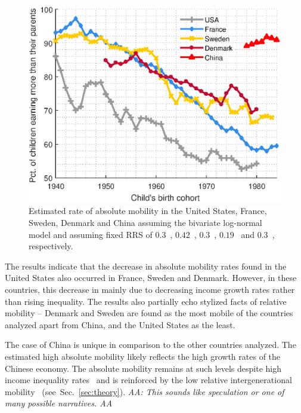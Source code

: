 \documentclass[12pt,a4paper]{article}
\newcommand{\red}[1]{{\color{red} #1}}
\newcommand{\sref}[1]{Sec.~\ref{sec:#1}}
\newcommand{\AAA}[1]{\red{{\it AA: #1 AA}}}
\newcommand{\flabel}[1]{\label{fig:#1}}
\numberwithin{equation}{section}
\begin{document}
\begin{figure}[!htb]
\centering
\includegraphics[width=1.0\textwidth] {./figs/countries2.eps}
\caption{Estimated rate of absolute mobility in the United States, France, Sweden, Denmark and China assuming the bivariate log-normal model and assuming fixed RRS of $0.3$~\citep{chetty2014land}, $0.42$~\citep{lefranc2005intergenerational}, $0.3$~\citep{bjorklund1997intergenerational}, $0.19$~\citep{landerso2016scandinavian} and $0.3$~\citep{fan2015great}, respectively.}
\flabel{countries}
\end{figure}

The results indicate that the decrease in absolute mobility rates found in the United States also occurred in France, Sweden and Denmark. However, in these countries, this decrease in mainly due to decreasing income growth rates rather than rising inequality. The results also partially echo stylized facts of relative mobility -- Denmark and Sweden are found as the most mobile of the countries analyzed apart from China, and the United States as the least.

The case of China is unique in comparison to the other countries analyzed. The estimated high absolute mobility likely reflects the high growth rates of the Chinese economy. The absolute mobility remains at such levels despite high income inequality rates~\citep{piketty2017capital} and is reinforced by the low relative intergenerational mobility~\citep{corak2013income,fan2015great} (see~\sref{theory}). \AAA{This sounds like speculation or one of many possible narratives.}
\end{document}
